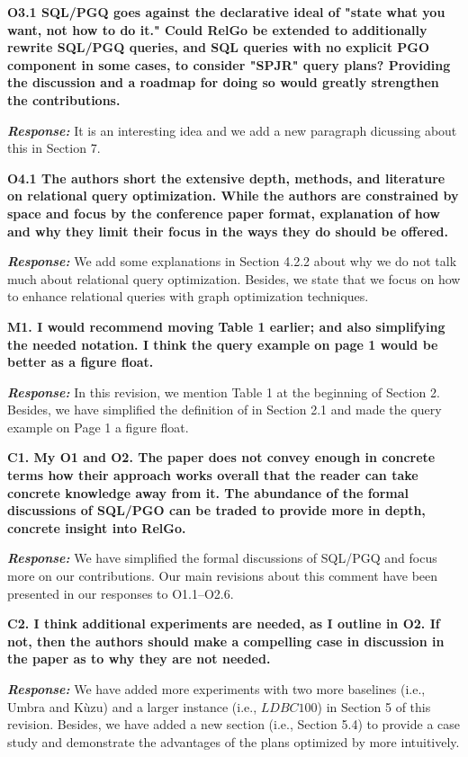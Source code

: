 \textbf{O3.1 SQL/PGQ goes against the declarative ideal of "state what you want, not how to do it."
Could RelGo be extended to additionally rewrite SQL/PGQ queries, and SQL queries with no explicit PGO component in some cases, to consider "SPJR" query plans?
Providing the discussion and a roadmap for doing so would greatly strengthen the contributions.}

\textbf{\textit{Response: }}
It is an interesting idea and we add a new paragraph dicussing about this in Section 7.

\textbf{O4.1 The authors short the extensive depth, methods, and literature on relational query optimization. While the authors are constrained by space and focus by the conference paper format, explanation of how and why they limit their focus in the ways they do should be offered. }

\textbf{\textit{Response: }}
We add some explanations in Section 4.2.2 about why we do not talk much about relational query optimization.
Besides, we state that we focus on how to enhance relational queries with graph optimization techniques.


\textbf{M1. I would recommend moving Table 1 earlier; and also simplifying the needed notation. I think the query example on page 1 would be better as a figure float. }

\textbf{\textit{Response: }}
In this revision, we mention Table 1 at the beginning of Section 2.
Besides, we have simplified the definition of \rgmapping in Section 2.1 and made the query example on Page 1 a figure float.


\textbf{
C1. My O1 and O2. The paper does not convey enough in concrete terms how their approach works overall that the reader can take concrete knowledge away from it. The abundance of the formal discussions of SQL/PGO can be traded to provide more in depth, concrete insight into RelGo.}

\textbf{\textit{Response: }}
We have simplified the formal discussions of SQL/PGQ and focus more on our contributions.
Our main revisions about this comment have been presented in our responses to O1.1--O2.6.


\textbf{
C2. I think additional experiments are needed, as I outline in O2. If not, then the authors should make a compelling case in discussion in the paper as to why they are not needed.}

\textbf{\textit{Response: }}
We have added more experiments with two more baselines (i.e., Umbra and K\`uzu) and a larger instance (i.e., $LDBC100$) in Section 5 of this revision.
Besides, we have added a new section (i.e., Section 5.4) to provide a case study and  demonstrate the advantages of the plans optimized by \name more intuitively.


